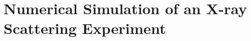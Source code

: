 \documentclass[11pt]{article}
\theoremstyle{definition}
\begin{document}
\section{Numerical Simulation of an X-ray Scattering Experiment}

%
%
%





 




\end{document}
